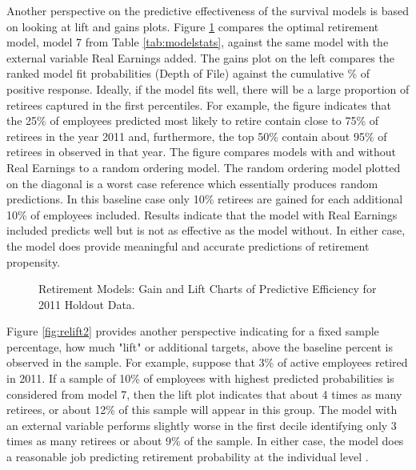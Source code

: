 	 
 Another perspective on the predictive effectiveness of the survival models is based on looking at lift and gains plots.  Figure \ref{fig:regainlift} compares the optimal retirement model, model 7 from Table \ref{tab:modelstats}, against the same model with the external variable Real Earnings added.  The gains plot on the left compares the ranked model fit probabilities (Depth of File) against the cumulative \% of positive response.  Ideally, if the model fits well, there will be a large proportion of retirees captured in the first percentiles. For example, the figure indicates that the 25\% of employees predicted most likely to retire contain close to 75\% of retirees in the year 2011 and, furthermore, the top 50\% contain about 95\% of retirees in observed in that year.  The figure compares models with and without Real Earnings to a random ordering model.  The random ordering model plotted on  the diagonal is a worst case reference which essentially produces random predictions.  In this baseline case only 10\% retirees are gained for each  additional 10\% of employees included.  Results indicate that the model with Real Earnings included predicts well but is not as effective as the model without.  In either case, the model does provide meaningful and accurate predictions of retirement propensity.
	 \begin{figure}[h!]
	 	\centering
	 	\caption{Retirement Models: Gain and Lift Charts of Predictive Efficiency for 2011 Holdout Data.}
	 	\label{fig:regainlift}
	 \end{figure}
 Figure \ref{fig:relift2} provides another perspective indicating for a fixed sample percentage, how much "lift" or additional targets, above the baseline percent is observed in the sample. For example, suppose that 3\% of active employees retired in 2011. If a sample of 10\% of employees with highest predicted probabilities is considered from model 7, then the lift plot indicates that about 4 times as many retirees, or about 12\% of this sample will appear in this group. The model with an external variable performs slightly worse in the first decile identifying only 3 times as many retirees or about 9\% of the sample.  In either case, the model does a reasonable job predicting retirement probability at the individual level \citep{kuhn2013}.  %
